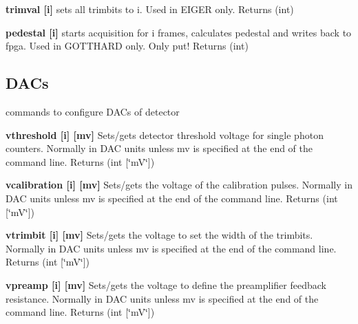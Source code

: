 \begin{DoxyItemize}
\item {\bfseries trimval \mbox{[}i\mbox{]}} sets all trimbits to i. Used in EIGER only. {\ttfamily Returns} {\ttfamily }(int)
\end{DoxyItemize}


\begin{DoxyItemize}
\item {\bfseries pedestal \mbox{[}i\mbox{]}} starts acquisition for i frames, calculates pedestal and writes back to fpga. Used in GOTTHARD only. Only put! {\ttfamily Returns} {\ttfamily }(int)
\end{DoxyItemize}\hypertarget{settings_settingsdacs}{}\subsection{DACs}\label{settings_settingsdacs}
commands to configure DACs of detector


\begin{DoxyItemize}
\item {\bfseries vthreshold \mbox{[}i\mbox{]} \mbox{[}mv\mbox{]}} Sets/gets detector threshold voltage for single photon counters. Normally in DAC units unless {\ttfamily mv} is specified at the end of the command line. {\ttfamily Returns} {\ttfamily }(int \mbox{[}\char`\"{}mV\char`\"{}\mbox{]})
\end{DoxyItemize}


\begin{DoxyItemize}
\item {\bfseries vcalibration \mbox{[}i\mbox{]} \mbox{[}mv\mbox{]}} Sets/gets the voltage of the calibration pulses. Normally in DAC units unless {\ttfamily mv} is specified at the end of the command line. {\ttfamily Returns} {\ttfamily }(int \mbox{[}\char`\"{}mV\char`\"{}\mbox{]})
\end{DoxyItemize}


\begin{DoxyItemize}
\item {\bfseries vtrimbit \mbox{[}i\mbox{]} \mbox{[}mv\mbox{]}} Sets/gets the voltage to set the width of the trimbits. Normally in DAC units unless {\ttfamily mv} is specified at the end of the command line. {\ttfamily Returns} {\ttfamily }(int \mbox{[}\char`\"{}mV\char`\"{}\mbox{]})
\end{DoxyItemize}


\begin{DoxyItemize}
\item {\bfseries vpreamp \mbox{[}i\mbox{]} \mbox{[}mv\mbox{]}} Sets/gets the voltage to define the preamplifier feedback resistance. Normally in DAC units unless {\ttfamily mv} is specified at the end of the command line. {\ttfamily Returns} {\ttfamily }(int \mbox{[}\char`\"{}mV\char`\"{}\mbox{]})
\end{DoxyItemize}


